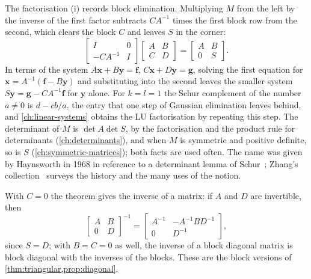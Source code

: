 The factorisation (i) records block elimination. Multiplying $M$ from the left by the inverse of the first factor subtracts $CA^{-1}$ times the first block row from the second, which clears the block $C$ and leaves $S$ in the corner:
\[
\begin{bmatrix}I&0\\-CA^{-1}&I\end{bmatrix}\begin{bmatrix}A&B\\C&D\end{bmatrix}=\begin{bmatrix}A&B\\0&S\end{bmatrix}.
\]
In terms of the system $A\mathbf x+B\mathbf y=\mathbf f$, $C\mathbf x+D\mathbf y=\mathbf g$, solving the first equation for $\mathbf x=A^{-1}(\mathbf f-B\mathbf y)$ and substituting into the second leaves the smaller system $S\mathbf y=\mathbf g-CA^{-1}\mathbf f$ for $\mathbf y$ alone. For $k=l=1$ the Schur complement of the number $a\ne0$ is $d-cb/a$, the entry that one step of Gaussian elimination leaves behind, and \cref{ch:linear-systems} obtains the LU factorisation by repeating this step. The determinant of $M$ is $\det A\det S$, by the factorisation and the product rule for determinants (\cref{ch:determinants}), and when $M$ is symmetric and positive definite, so is $S$ (\cref{ch:symmetric-matrices}); both facts are used often. The name was given by Haynsworth in 1968 in reference to a determinant lemma of Schur~\cite{schur1917}; Zhang's collection~\cite{zhang2005schur} surveys the history and the many uses of the notion.

With $C=0$ the theorem gives the inverse of a  matrix: if $A$ and $D$ are invertible, then
\[
\begin{bmatrix}A&B\\0&D\end{bmatrix}^{-1}=\begin{bmatrix}A^{-1}&-A^{-1}BD^{-1}\\0&D^{-1}\end{bmatrix},
\]
since $S=D$; with $B=C=0$ as well, the inverse of a block diagonal matrix is block diagonal with the inverses of the blocks. These are the block versions of \cref{thm:triangular,prop:diagonal}.

